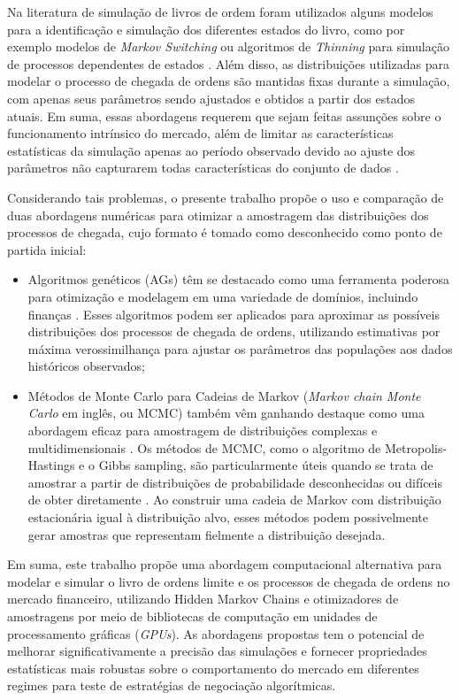 Na literatura de simulação de livros de ordem foram utilizados alguns modelos para a identificação e simulação dos diferentes estados do livro, como por exemplo modelos de \textit{Markov Switching} \citep{Guilbaud2013} ou algoritmos de \textit{Thinning} para simulação de processos dependentes de estados \citep{Ponta2012}. Além disso, as distribuições utilizadas para modelar o processo de chegada de ordens são mantidas fixas durante a simulação, com apenas seus parâmetros sendo ajustados e obtidos a partir dos estados atuais. Em suma, essas abordagens requerem que sejam feitas assunções sobre o funcionamento intrínsico do mercado, além de limitar as características estatísticas da simulação apenas ao período observado devido ao ajuste dos parâmetros não capturarem todas características do conjunto de dados \citep{Zare2021}.

Considerando tais problemas, o presente trabalho propõe o uso e comparação de duas abordagens numéricas para otimizar a amostragem das distribuições dos processos de chegada, cujo formato é tomado como desconhecido como ponto de partida inicial: 
\begin{itemize}
	\item Algoritmos genéticos (AGs) têm se destacado como uma ferramenta poderosa para otimização e modelagem em uma variedade de domínios, incluindo finanças \citep{Oesch2013, Katoch2021}. Esses algoritmos podem ser aplicados para aproximar as possíveis distribuições dos processos de chegada de ordens, utilizando estimativas por máxima verossimilhança \citep{Boonthiem2023, Colla2010} para ajustar os parâmetros das populações aos dados históricos observados;
	
	\item Métodos de Monte Carlo para Cadeias de Markov (\textit{Markov chain Monte Carlo } em inglês, ou MCMC) também vêm ganhando destaque como uma abordagem eficaz para amostragem de distribuições complexas e multidimensionais \citep{Rasmussen2013, Rousseau2018}. Os métodos de MCMC, como o algoritmo de Metropolis-Hastings e o Gibbs sampling, são particularmente úteis quando se trata de amostrar a partir de distribuições de probabilidade desconhecidas ou difíceis de obter diretamente \citep{Glasserman2004}. Ao construir uma cadeia de Markov com distribuição estacionária igual à distribuição alvo, esses métodos podem possivelmente gerar amostras que representam fielmente a distribuição desejada.
\end{itemize}

Em suma, este trabalho propõe uma abordagem computacional alternativa para modelar e simular o livro de ordens limite e os processos de chegada de ordens no mercado financeiro, utilizando Hidden Markov Chains e otimizadores de amostragens por meio de bibliotecas de computação em unidades de processamento gráficas (\textit{GPUs}). As abordagens propostas tem o potencial de melhorar significativamente a precisão das simulações e fornecer propriedades estatísticas mais robustas sobre o comportamento do mercado em diferentes regimes para teste de estratégias de negociação algorítmicas.
